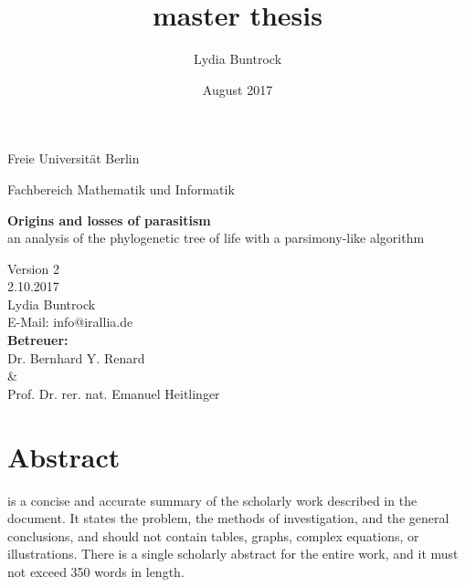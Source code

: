 
\author{Lydia Buntrock}
\title{master thesis}
\date{August 2017}


  \begin{titlepage}
    \pagestyle{empty}
  	\begin{center}
      {\Large Freie Universität Berlin}\\
    	\begin{Huge}
      	Fachbereich Mathematik und Informatik\\
      	\vspace{3mm}
    	\end{Huge}
    	\vspace{20mm}
    	\begin{Large}
    	    \textbf{Origins and losses of parasitism}\\
          an analysis of the phylogenetic tree of life with a parsimony-like algorithm\\
    	\end{Large}
    	\vspace{8mm}
      Version 2\\
      2.10.2017\\
    	\vspace{2cm}
    	Lydia Buntrock \\
      E-Mail: info@irallia.de\\
     	\vspace{5cm}
      \textbf{Betreuer:}\\
      Dr. Bernhard Y. Renard\\
      \& \\
      Prof. Dr. rer. nat. Emanuel Heitlinger\\      
  	\end{center}
  	\clearpage
  \end{titlepage}

\chapter*{Abstract}
   is a concise and accurate summary of the scholarly work described in the 
  document. It states the problem, the methods of investigation, and the general conclusions, and 
  should not contain tables, graphs, complex equations, or illustrations. There is a single 
  scholarly abstract for the entire work, and it must not exceed 350 words in length.

